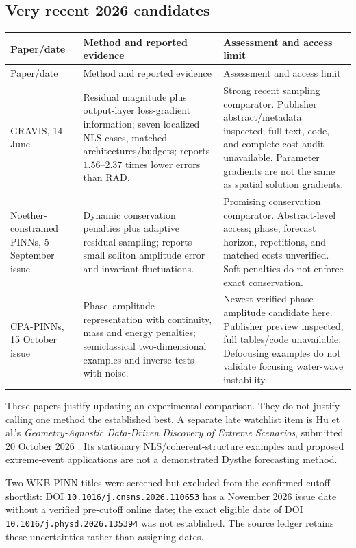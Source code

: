 \subsection{Very recent 2026 candidates}
\begin{longtable}{@{}P{0.22\textwidth}P{0.35\textwidth}P{0.35\textwidth}@{}}
\toprule
Paper/date & Method and reported evidence & Assessment and access limit \\
\midrule
\endfirsthead
\toprule
Paper/date & Method and reported evidence & Assessment and access limit \\
\midrule
\endhead
GRAVIS, 14 June \cite{gravis} &
Residual magnitude plus output-layer loss-gradient information; seven
localized NLS cases, matched architectures/budgets; reports
$1.56$--$2.37$ times lower errors than RAD. &
Strong recent sampling comparator. Publisher abstract/metadata inspected;
full text, code, and complete cost audit unavailable. Parameter gradients
are not the same as spatial solution gradients. \\
\addlinespace
Noether-constrained PINNs, 5 September issue \cite{noether} &
Dynamic conservation penalties plus adaptive residual sampling; reports
small soliton amplitude error and invariant fluctuations. &
Promising conservation comparator. Abstract-level access; phase,
forecast horizon, repetitions, and matched costs unverified. Soft penalties
do not enforce exact conservation. \\
\addlinespace
CPA-PINNs, 15 October issue \cite{cpa} &
Phase--amplitude representation with continuity, mass and energy penalties;
semiclassical two-dimensional examples and inverse tests with noise. &
Newest verified phase--amplitude candidate here. Publisher preview
inspected; full tables/code unavailable. Defocusing examples do not validate
focusing water-wave instability. \\
\bottomrule
\end{longtable}

These papers justify updating an experimental comparison. They do not
justify calling one method the established best. A separate late watchlist
item is Hu et al.'s \emph{Geometry-Agnostic Data-Driven Discovery of Extreme
Scenarios}, submitted 20 October 2026 \cite{extreme2026}. Its stationary
NLS/coherent-structure examples and proposed extreme-event applications
are not a demonstrated Dysthe forecasting method.

Two WKB-PINN titles were screened but excluded from the confirmed-cutoff
shortlist: DOI \texttt{10.1016/j.cnsns.2026.110653} has a November 2026
issue date without a verified pre-cutoff online date; the exact eligible
date of DOI \texttt{10.1016/j.physd.2026.135394} was not established.
The source ledger retains these uncertainties rather than assigning dates.

